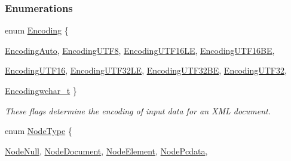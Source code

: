 \subsubsection*{Enumerations}
\begin{DoxyCompactItemize}
\item 
enum \hyperlink{namespaceMezzanine_1_1xml_ab1e7e96991b9c08ac13e797a15253804}{Encoding} \{ \par
\hyperlink{namespaceMezzanine_1_1xml_ab1e7e96991b9c08ac13e797a15253804a303b320bd2328a84eae5d4e5cc46c885}{EncodingAuto}, 
\hyperlink{namespaceMezzanine_1_1xml_ab1e7e96991b9c08ac13e797a15253804a59138132633d4eaf6be6b9aeebc2553f}{EncodingUTF8}, 
\hyperlink{namespaceMezzanine_1_1xml_ab1e7e96991b9c08ac13e797a15253804a9bdf6c9f179b5d748e7eec3d8d0d8ddc}{EncodingUTF16LE}, 
\hyperlink{namespaceMezzanine_1_1xml_ab1e7e96991b9c08ac13e797a15253804a0262666c5077433915570f2808a064f1}{EncodingUTF16BE}, 
\par
\hyperlink{namespaceMezzanine_1_1xml_ab1e7e96991b9c08ac13e797a15253804a68eb27855ed7d381db0b648d022464bf}{EncodingUTF16}, 
\hyperlink{namespaceMezzanine_1_1xml_ab1e7e96991b9c08ac13e797a15253804ac92bd9352f86b6e135771305e77ebdec}{EncodingUTF32LE}, 
\hyperlink{namespaceMezzanine_1_1xml_ab1e7e96991b9c08ac13e797a15253804ac2fa00f578738cec0c048eef2b28d240}{EncodingUTF32BE}, 
\hyperlink{namespaceMezzanine_1_1xml_ab1e7e96991b9c08ac13e797a15253804a2a1590a15026b893610e8903249ef0c5}{EncodingUTF32}, 
\par
\hyperlink{namespaceMezzanine_1_1xml_ab1e7e96991b9c08ac13e797a15253804a81a663e659d619801a8e37dd84f4a4b9}{Encodingwchar\_\-t}
 \}
\begin{DoxyCompactList}\small\item\em These flags determine the encoding of input data for an XML document. \item\end{DoxyCompactList}\item 
enum \hyperlink{namespaceMezzanine_1_1xml_a524d867e34ff408b8f45a51b7924cb80}{NodeType} \{ \par
\hyperlink{namespaceMezzanine_1_1xml_a524d867e34ff408b8f45a51b7924cb80a946ce292f9a634abb136995a3846105a}{NodeNull}, 
\hyperlink{namespaceMezzanine_1_1xml_a524d867e34ff408b8f45a51b7924cb80a52b25e1163d2f23214bf42f34d0bfd9e}{NodeDocument}, 
\hyperlink{namespaceMezzanine_1_1xml_a524d867e34ff408b8f45a51b7924cb80a2bb22ce62dcd3e3d2bb9752d1d34e3ff}{NodeElement}, 
\hyperlink{namespaceMezzanine_1_1xml_a524d867e34ff408b8f45a51b7924cb80aa291a3c3321f69e9097acaf8a54cf158}{NodePcdata}, 
\par

\end{DoxyCompactItemize}
